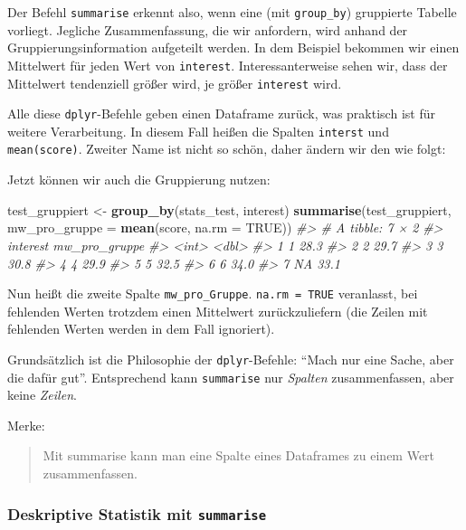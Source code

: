 \documentclass[12pt,ngerman,]{book}
\makeatletter
\newenvironment{Shaded}{\begin{snugshade}}{\end{snugshade}}
\newcommand{\KeywordTok}[1]{\textcolor[rgb]{0.13,0.29,0.53}{\textbf{{#1}}}}
\newcommand{\DataTypeTok}[1]{\textcolor[rgb]{0.13,0.29,0.53}{{#1}}}
\newcommand{\StringTok}[1]{\textcolor[rgb]{0.31,0.60,0.02}{{#1}}}
\newcommand{\CommentTok}[1]{\textcolor[rgb]{0.56,0.35,0.01}{\textit{{#1}}}}
\newcommand{\OtherTok}[1]{\textcolor[rgb]{0.56,0.35,0.01}{{#1}}}
\newcommand{\NormalTok}[1]{{#1}}
\newenvironment{kframe}{%
\medskip{}
\setlength{\fboxsep}{.8em}
 \def\at@end@of@kframe{}%
 \ifinner\ifhmode%
  \def\at@end@of@kframe{\end{minipage}}%
  \begin{minipage}{\columnwidth}%
 \fi\fi%
 \def\FrameCommand##1{\hskip\@totalleftmargin \hskip-\fboxsep
 \colorbox{shadecolor}{##1}\hskip-\fboxsep
     \hskip-\linewidth \hskip-\@totalleftmargin \hskip\columnwidth}%
 \MakeFramed {\advance\hsize-\width
   \@totalleftmargin\z@ \linewidth\hsize
   \@setminipage}}%
 {\par\unskip\endMakeFramed%
 \at@end@of@kframe}
\renewenvironment{Shaded}{\begin{kframe}}{\end{kframe}}
\makeatother
\begin{document}
Der Befehl \texttt{summarise} erkennt also, wenn eine (mit
\texttt{group\_by}) gruppierte Tabelle vorliegt. Jegliche
Zusammenfassung, die wir anfordern, wird anhand der
Gruppierungsinformation aufgeteilt werden. In dem Beispiel bekommen wir
einen Mittelwert für jeden Wert von \texttt{interest}.
Interessanterweise sehen wir, dass der Mittelwert tendenziell größer
wird, je größer \texttt{interest} wird.

Alle diese \texttt{dplyr}-Befehle geben einen Dataframe zurück, was
praktisch ist für weitere Verarbeitung. In diesem Fall heißen die
Spalten \texttt{interst} und \texttt{mean(score)}. Zweiter Name ist
nicht so schön, daher ändern wir den wie folgt:

Jetzt können wir auch die Gruppierung nutzen:

\begin{Shaded}
\begin{Highlighting}[]
\NormalTok{test_gruppiert <-}\StringTok{ }\KeywordTok{group_by}\NormalTok{(stats_test, interest)}
\KeywordTok{summarise}\NormalTok{(test_gruppiert, }\DataTypeTok{mw_pro_gruppe =} \KeywordTok{mean}\NormalTok{(score, }\DataTypeTok{na.rm =} \OtherTok{TRUE}\NormalTok{))}
\CommentTok{#> # A tibble: 7 × 2}
\CommentTok{#>   interest mw_pro_gruppe}
\CommentTok{#>      <int>         <dbl>}
\CommentTok{#> 1        1          28.3}
\CommentTok{#> 2        2          29.7}
\CommentTok{#> 3        3          30.8}
\CommentTok{#> 4        4          29.9}
\CommentTok{#> 5        5          32.5}
\CommentTok{#> 6        6          34.0}
\CommentTok{#> 7       NA          33.1}
\end{Highlighting}
\end{Shaded}

Nun heißt die zweite Spalte \texttt{mw\_pro\_Gruppe}.
\texttt{na.rm\ =\ TRUE} veranlasst, bei fehlenden Werten trotzdem einen
Mittelwert zurückzuliefern (die Zeilen mit fehlenden Werten werden in
dem Fall ignoriert).

Grundsätzlich ist die Philosophie der \texttt{dplyr}-Befehle: ``Mach nur
eine Sache, aber die dafür gut''. Entsprechend kann \texttt{summarise}
nur \emph{Spalten} zusammenfassen, aber keine \emph{Zeilen}.

Merke:

\begin{quote}
Mit summarise kann man eine Spalte eines Dataframes zu einem Wert
zusammenfassen.
\end{quote}

\subsubsection{\texorpdfstring{Deskriptive Statistik mit
\texttt{summarise}}{Deskriptive Statistik mit summarise}}\label{deskriptive-statistik-mit-summarise}
\end{document}
